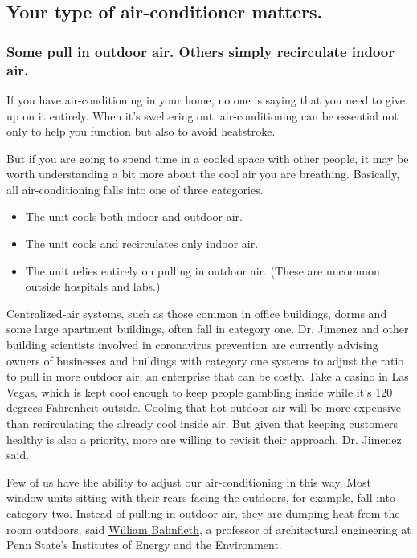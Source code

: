 \hypertarget{your-type-of-air-conditioner-matters}{%
\subsection{Your type of air-conditioner
matters.}\label{your-type-of-air-conditioner-matters}}

\hypertarget{some-pull-in-outdoor-air-others-simply-recirculate-indoor-air}{%
\subsubsection{Some pull in outdoor air. Others simply recirculate
indoor
air.}\label{some-pull-in-outdoor-air-others-simply-recirculate-indoor-air}}

If you have air-conditioning in your home, no one is saying that you
need to give up on it entirely. When it's sweltering out,
air-conditioning can be essential not only to help you function but also
to avoid heatstroke.

But if you are going to spend time in a cooled space with other people,
it may be worth understanding a bit more about the cool air you are
breathing. Basically, all air-conditioning falls into one of three
categories.

\begin{itemize}
\item
  The unit cools both indoor and outdoor air.
\item
  The unit cools and recirculates only indoor air.
\item
  The unit relies entirely on pulling in outdoor air. (These are
  uncommon outside hospitals and labs.)
\end{itemize}

Centralized-air systems, such as those common in office buildings, dorms
and some large apartment buildings, often fall in category one. Dr.
Jimenez and other building scientists involved in coronavirus prevention
are currently advising owners of businesses and buildings with category
one systems to adjust the ratio to pull in more outdoor air, an
enterprise that can be costly. Take a casino in Las Vegas, which is kept
cool enough to keep people gambling inside while it's 120 degrees
Fahrenheit outside. Cooling that hot outdoor air will be more expensive
than recirculating the already cool inside air. But given that keeping
customers healthy is also a priority, more are willing to revisit their
approach, Dr. Jimenez said.

Few of us have the ability to adjust our air-conditioning in this way.
Most window units sitting with their rears facing the outdoors, for
example, fall into category two. Instead of pulling in outdoor air, they
are dumping heat from the room outdoors, said
\href{https://iee.psu.edu/content/william-bahnfleth}{William Bahnfleth},
a professor of architectural engineering at Penn State's Institutes of
Energy and the Environment.

